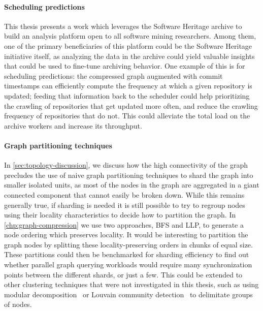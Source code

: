 \paragraph*{Scheduling predictions}

This thesis presents a work which leverages the Software Heritage archive to
build an analysis platform open to all software mining researchers. Among them,
one of the primary beneficiaries of this platform could be the Software Heritage
initiative itself, as analyzing the data in the archive could yield valuable
insights that could be used to fine-tune archiving behavior. One example of
this is for scheduling predictions: the compressed graph augmented with commit
timestamps can efficiently compute the frequency at which a given repository is
updated; feeding that information back to the scheduler could help prioritizing
the crawling of repositories that get updated more often, and reduce the
crawling frequency of repositories that do not. This could alleviate the total
load on the archive workers and increase its throughput.

\paragraph*{Graph partitioning techniques}

In \cref{sec:topology-discussion}, we discuss how the high connectivity of the
graph precludes the use of naive graph partitioning techniques to shard the
graph into smaller isolated units, as most of the nodes in the graph are
aggregated in a giant connected component that cannot easily be broken down.
While this remains generally true, if sharding is needed it is still possible
to try to regroup nodes using their locality characteristics to decide how to
partition the graph. In \cref{chp:graph-compression} we use two approaches,
\gls{BFS} and \gls{LLP}, to generate a node ordering which preserves locality.
It would be interesting to partition the graph nodes by splitting these
locality-preserving orders in chunks of equal size. These partitions could then
be benchmarked for sharding efficiency to find out whether parallel graph
querying workloads would require many synchronization points between the
different shards, or just a few. This could be extended to other clustering
techniques that were not investigated in this thesis, such as using modular
decomposition~\cite{gallai1967transitiv,mcconnell2005linear,NABTI201763} or
Louvain community detection~\cite{blondel2008fast} to delimitate groups of
nodes.

